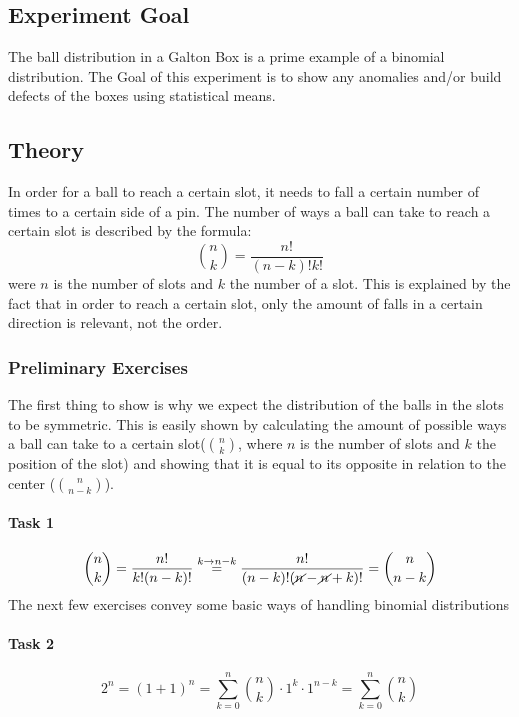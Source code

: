 \documentclass{scrreprt}
\begin{document}
\subsection{Experiment Goal}
The ball distribution in a Galton Box is a prime example of a binomial distribution. The Goal of this experiment is to show any anomalies and/or build defects of the boxes using statistical means.
\subsection{Theory}
In order for a ball to reach a certain slot, it needs to fall a certain number of times to a certain side of a pin. The number of ways a ball can take to reach a certain slot is described by the formula:
\[\binom{n}{k}=\frac{n!}{(n-k)!k!}\]
were $n$ is the number of slots and $k$ the number of a slot.
This is explained by the fact that in order to reach a certain slot, only the amount of falls in a certain direction is relevant, not the order.

\subsubsection{Preliminary Exercises}
The first thing to show is why we expect the distribution of the balls in the slots to be symmetric. This is easily shown by calculating the amount of possible ways a ball can take to a certain slot($\binom{n}{k}$, where $n$ is the number of slots and $k$ the position of the slot) and showing that it is equal to its opposite in relation to the center ($\binom{n}{n-k}$).
\paragraph*{Task 1}
\begin{equation}
\binom{n}{k} = \frac{n!}{k!(n-k)!} \stackrel{k\rightarrow n-k}{=} \frac{n!}{(n-k)!(\cancel{n}-\cancel{n}+k)!} = \binom{n}{n-k}
\end{equation}
The next few exercises convey some basic ways of handling binomial distributions

\paragraph*{Task 2}
\begin{equation}
2^n = (1+1)^n = \sum\limits_{k=0}^{n}\binom{n}{k} \cdot 1^k \cdot 1^{n-k} = \sum\limits_{k=0}^{n}\binom{n}{k}
\end{equation}
\end{document}

